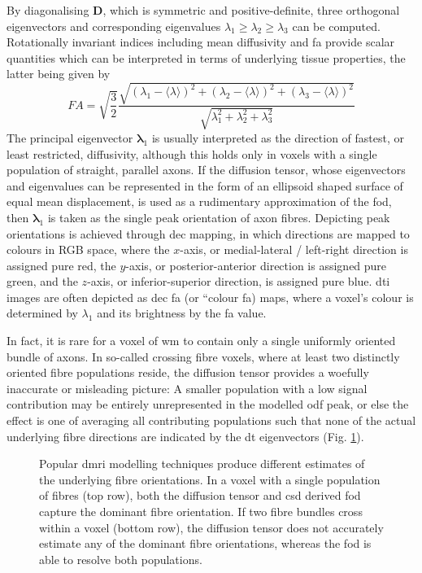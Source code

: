 By diagonalising $\mathbf{D}$, which is symmetric and positive-definite, three orthogonal eigenvectors and corresponding eigenvalues $\lambda_1 \geqslant \lambda_2 \geqslant \lambda_3$ can be computed.
Rotationally invariant indices including mean diffusivity and \gls{fa} provide scalar quantities which can be interpreted in terms of underlying tissue properties, the latter being given by
\begin{equation}
  FA = \sqrt{\frac{3}{2}}\frac{\sqrt{(\lambda_1 - \langle \lambda \rangle)^2 + (\lambda_2 - \langle \lambda \rangle)^2 + (\lambda_3 - \langle \lambda \rangle)^2}}{\sqrt{\lambda_1^2 + \lambda_2^2+ \lambda_3^2}}
\end{equation}
The principal eigenvector $\bm{\lambda}_1$ is usually interpreted as the direction of fastest, or least restricted, diffusivity, although this holds only in voxels with a single population of straight, parallel axons.
If the diffusion tensor, whose eigenvectors and eigenvalues can be represented in the form of an ellipsoid shaped surface of equal mean displacement, is used as a rudimentary approximation of the \gls{fod}, then $\bm{\lambda}_1$ is taken as the single peak orientation of axon fibres.
Depicting peak orientations is achieved through \gls{dec} mapping, in which directions are mapped to colours in RGB space, where the $x$-axis, or medial-lateral / left-right direction is assigned pure red, the $y$-axis, or posterior-anterior direction is assigned pure green, and the $z$-axis, or inferior-superior direction, is assigned pure blue.
\Gls{dti} images are often depicted as \gls{dec} \gls{fa} (or ``colour \gls{fa}) maps, where a voxel's colour is determined by $\lambda_1$ and its brightness by the \gls{fa} value.

In fact, it is rare for a voxel of \gls{wm} to contain only a single uniformly oriented bundle of axons.
In so-called crossing fibre voxels, where at least two distinctly oriented fibre populations reside, the diffusion tensor provides a woefully inaccurate or misleading picture:
A smaller population with a low signal contribution may be entirely unrepresented in the modelled \gls{odf} peak, or else the effect is one of averaging all contributing populations such that none of the actual underlying fibre directions are indicated by the \gls{dt} eigenvectors (Fig. \ref{fig:cross}).

\begin{figure}
  \centering
  
  \caption{Popular \gls{dmri} modelling techniques produce different estimates of the underlying fibre orientations. In a voxel with a single population of fibres (top row), both the diffusion tensor and \gls{csd} derived \gls{fod} capture the dominant fibre orientation. If two fibre bundles cross within a voxel (bottom row), the diffusion tensor does not accurately estimate any of the dominant fibre orientations, whereas the \gls{fod} is able to resolve both populations.}
  \label{fig:cross}
\end{figure}

